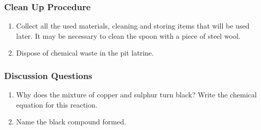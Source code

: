 \subsubsection*{Clean Up Procedure}
\begin{enumerate}
\item{Collect all the used materials, cleaning and storing items that will be used later. It may be necessary to clean the spoon with a piece of steel wool.}
\item{Dispose of chemical waste in the pit latrine.}
\end{enumerate}

\subsubsection*{Discussion Questions}
\begin{enumerate}
\item{Why does the mixture of copper and sulphur turn black? Write the chemical equation for this reaction.}
\item{Name the black compound formed.}
\end{enumerate}
